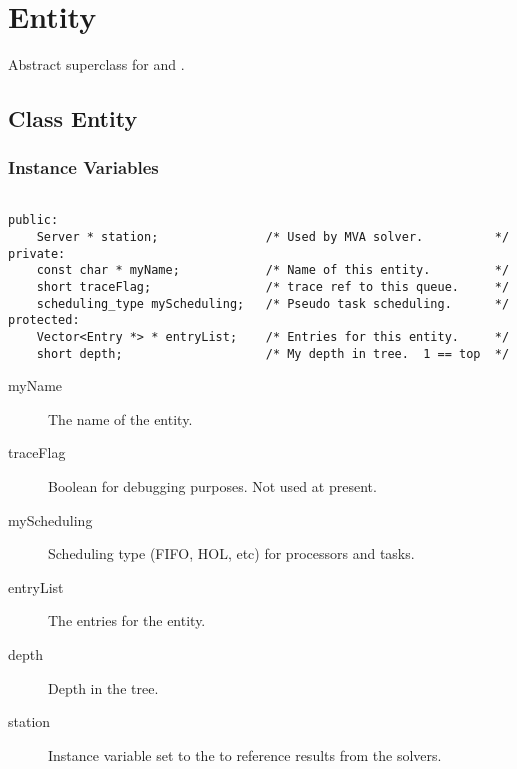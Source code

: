 % 
% 
%
%
%
%
%
%
%
\section{Entity}
\label{sec:entity}

Abstract superclass for  and
. 

\subsection{Class Entity}
\subsubsection{Instance Variables}
\label{sec:entity-ivars}

\begin{verbatim}

public:
    Server * station;               /* Used by MVA solver.          */
private:
    const char * myName;            /* Name of this entity.         */
    short traceFlag;                /* trace ref to this queue.     */
    scheduling_type myScheduling;   /* Pseudo task scheduling.      */
protected:
    Vector<Entry *> * entryList;    /* Entries for this entity.     */
    short depth;                    /* My depth in tree.  1 == top  */
\end{verbatim}

\begin{description}
\item[myName] \texonly{---} The name of the entity.
\item[traceFlag] \texonly{---} Boolean for debugging purposes.  Not
  used at present.
\item[myScheduling] \texonly{---} Scheduling type (FIFO, HOL, etc) for
  processors and tasks.
\item[entryList] \texonly{---} The entries for the entity.
\item[depth] \texonly{---} Depth in the tree.
\item[station] \texonly{---} Instance variable set to the
   to reference results from the
   solvers.
\end{description}

